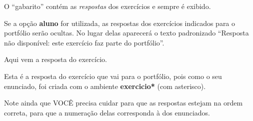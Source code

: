 \documentclass[a4paper]{article}
\newcommand\code[1]{\textbf{#1}}
\begin{document}
  \begin{respostas}
    
    O ``gabarito'' contém as \emph{respostas} dos exercícios e sempre é exibido.
    
    Se a opção \code{aluno} for utilizada,
    as respostas dos exercícios indicados para o portfólio serão ocultas.
    No lugar delas aparecerá o texto padronizado
    ``Resposta não disponível: este exercício faz parte do portfólio''.
    
    \begin{exercicio}
      Aqui vem a resposta do exercício.
    \end{exercicio}
    
  
  
    \begin{exercicio*}
      Esta é a resposta do exercício que vai para o portfólio, pois como o seu enunciado, foi criada com o ambiente \code{exercicio*} (com asterisco).
    \end{exercicio*}

  
  
    \begin{exercicio}
      Note ainda que VOCÊ precisa cuidar para que as respostas estejam na ordem correta,
      para que a numeração delas corresponda à dos enunciados.
    \end{exercicio}

  \end{respostas}

  
  
  
  
  
  
  
  
\end{document}
